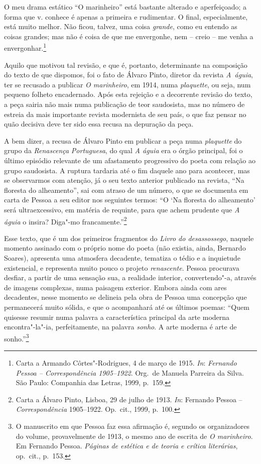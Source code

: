\begin{hedraquote}
O meu drama estático “O marinheiro” está bastante alterado e
aperfeiçoado; a forma que v. conhece é apenas a primeira e
rudimentar.
O final, especialmente, está muito melhor.
Não ficou, talvez, uma coisa
\textit{grande}, como eu entendo as coisas grandes;
mas não é coisa de
que me envergonhe, nem -- creio -- me
venha a envergonhar.\footnote{
Carta a Armando Côrtes"-Rodrigues, 4 de março de 1915.
\textit{In}: \textit{Fernando Pessoa --
Correspondência 1905--1922}. Org.~de Manuela Parreira
da Silva. São Paulo: Companhia das Letras, 1999, p.~159.}
\end{hedraquote}

Aquilo que motivou tal revisão, e que é, portanto, determinante na
composição do texto de que dispomos, foi o fato de Álvaro Pinto,
diretor da revista \mbox{\textit{A águia}}, ter se recusado a publicar
\textit{O marinheiro}, em 1914, numa \textit{plaquette},
ou seja, num
pequeno folheto encadernado. Após esta rejeição 
e a decorrente revisão
do texto, a peça sairia não mais numa publicação de teor
saudosista,
mas no número de estreia da mais importante
revista modernista de seu
país, o que faz pensar no quão decisiva deve 
ter sido essa recusa na depuração da peça. 

A bem dizer, a recusa de Álvaro Pinto em publicar a peça numa
\textit{plaquette} do grupo da \textit{Renascença}
\textit{Portuguesa},
do qual \textit{A águia} era o órgão principal, 
foi o último episódio
relevante de um afastamento progressivo do
poeta com relação ao grupo
saudosista. A ruptura tardaria até o 
fim daquele ano para acontecer,
mas se observarmos com atenção, já o seu
texto anterior publicado na
revista, “Na floresta do alheamento”, 
sai com atraso de um número, o
que se documenta em carta de Pessoa
a seu editor nos seguintes termos:
“O ‘Na floresta do alheamento’ será ultraexcessivo, em matéria de
requinte, para que achem prudente que \textit{A águia} o insira?
Diga"-mo francamente.”\footnote{ Carta a Álvaro Pinto,
Lisboa, 29 de julho de 1913. \textit{In}: Fernando Pessoa --
\textit{Correspondência}
1905--1922. Op.~cit., 1999, p.~100.} 

Esse texto, que é um dos primeiros fragmentos do \textit{Livro do
desassossego}, naquele momento assinado 
com o próprio nome do poeta
(não existia, ainda, Bernardo Soares), apresenta uma atmosfera
decadente, tematiza o tédio e a inquietude existencial,
e representa
muito pouco o projeto \textit{renascente}.
Pessoa procurava desfiar, a
partir de uma sensação sua, a realidade interior, convertendo"-a,
através de imagens complexas, numa paisagem exterior.
Embora ainda com
ares decadentes, nesse momento se delineia pela obra de Pessoa uma
concepção que permanecerá muito sólida, e que o acompanhará até os
últimos poemas: “Quem quisesse resumir numa palavra a
característica
principal da arte moderna encontra"-la"-ia, 
perfeitamente, na palavra
\textit{sonho}. A arte moderna é arte de 
sonho.”\footnote{ O manuscrito
em que Pessoa faz essa afirmação é, segundo
os organizadores do volume,
provavelmente de 1913, o mesmo ano de escrita 
de \textit{O marinheiro}. Em
Fernando Pessoa. \textit{Páginas
de estética e de teoria e crítica
literárias}, op.~cit., p.~153.} 

